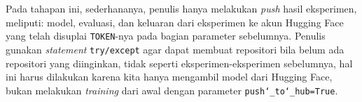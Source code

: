 Pada tahapan ini, sederhananya, penulis hanya melakukan \emph{push} hasil eksperimen, meliputi: model, evaluasi, dan keluaran dari eksperimen ke akun Hugging Face yang telah disuplai \texttt{TOKEN}-nya pada bagian parameter sebelumnya. Penulis gunakan \emph{statement} \texttt{try/except} agar dapat membuat repositori bila belum ada repositori yang diinginkan, tidak seperti eksperimen-eksperimen sebelumnya, hal ini harus dilakukan karena kita hanya mengambil model dari Hugging Face, bukan melakukan \emph{training} dari awal dengan parameter \texttt{push\char`_to\char`_hub=True}.